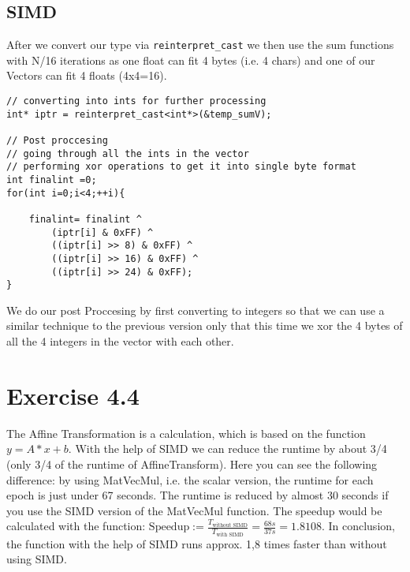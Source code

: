 \documentclass[a4paper]{article}
\begin{document}
\subsection*{SIMD}
After we convert our type via \verb|reinterpret_cast| we then use the sum functions with N/16 iterations as one float can fit 4 bytes (i.e. 4 chars) and one of our Vectors can fit 4 floats (4x4=16).
\begin{lstlisting}
// converting into ints for further processing
int* iptr = reinterpret_cast<int*>(&temp_sumV);

// Post proccesing
// going through all the ints in the vector
// performing xor operations to get it into single byte format
int finalint =0;
for(int i=0;i<4;++i){

    finalint= finalint ^
        (iptr[i] & 0xFF) ^
        ((iptr[i] >> 8) & 0xFF) ^
        ((iptr[i] >> 16) & 0xFF) ^
        ((iptr[i] >> 24) & 0xFF);
}
\end{lstlisting}
We do our post Proccesing by first converting to integers so that we can use a similar technique to the previous version only that this time we xor the 4 bytes of all the 4 integers in the vector with each other.


\section*{Exercise 4.4}

The Affine Transformation is a calculation, which is based on the function $y = A*x+b.$
With the help of SIMD we can reduce the runtime by about 3/4 (only 3/4 of the runtime of AffineTransform). Here you can see the following difference: by using MatVecMul, i.e. the scalar version, the runtime for each epoch is just under 67 seconds.
The runtime is reduced by almost 30 seconds if you use the SIMD version of the MatVecMul function. The speedup would be calculated with the function: $
\text{Speedup} := \frac{T_{\text{without SIMD}}}{T_{\text{with SIMD}}} = \frac{68s}{37s} = 1.8108 $. In conclusion, the function with the help of SIMD runs approx. 1,8 times faster than without using SIMD.
\end{document}
